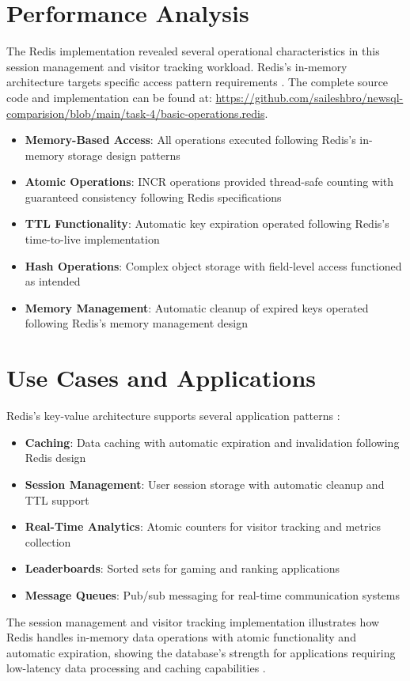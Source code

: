 \section{Performance Analysis}

The Redis implementation revealed several operational characteristics in this session management and visitor tracking workload. Redis's in-memory architecture targets specific access pattern requirements \parencite{redis_paper}. The complete source code and implementation can be found at: \url{https://github.com/saileshbro/newsql-comparision/blob/main/task-4/basic-operations.redis}.

\begin{itemize}
    \item \textbf{Memory-Based Access}: All operations executed following Redis's in-memory storage design patterns \parencite{redis_documentation}
    \item \textbf{Atomic Operations}: INCR operations provided thread-safe counting with guaranteed consistency following Redis specifications \parencite{redis_paper}
    \item \textbf{TTL Functionality}: Automatic key expiration operated following Redis's time-to-live implementation \parencite{redis_ttl}
    \item \textbf{Hash Operations}: Complex object storage with field-level access functioned as intended \parencite{redis_documentation}
    \item \textbf{Memory Management}: Automatic cleanup of expired keys operated following Redis's memory management design \parencite{redis_ttl}
\end{itemize}

\section{Use Cases and Applications}

Redis's key-value architecture supports several application patterns \parencite{redis_documentation}:

\begin{itemize}
    \item \textbf{Caching}: Data caching with automatic expiration and invalidation following Redis design \parencite{redis_paper}
    \item \textbf{Session Management}: User session storage with automatic cleanup and TTL support \parencite{redis_ttl}
    \item \textbf{Real-Time Analytics}: Atomic counters for visitor tracking and metrics collection \parencite{redis_documentation}
    \item \textbf{Leaderboards}: Sorted sets for gaming and ranking applications \parencite{redis_paper}
    \item \textbf{Message Queues}: Pub/sub messaging for real-time communication systems \parencite{redis_documentation}
\end{itemize}

The session management and visitor tracking implementation illustrates how Redis handles in-memory data operations with atomic functionality and automatic expiration, showing the database's strength for applications requiring low-latency data processing and caching capabilities \parencite{redis_paper}.